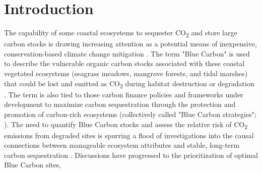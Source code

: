 \section{Introduction}

The capability of some coastal ecosystems to sequester CO\textsubscript{2} and store large carbon stocks is drawing increasing attention as a potential means of inexpensive, conservation-based climate change mitigation \citep{Hiraishi:2014uo}. The term "Blue Carbon" is used to describe the vulnerable organic carbon stocks associated with these coastal vegetated ecosystems (seagrass meadows, mangrove forests, and tidal marshes) that could be lost and emitted as CO\textsubscript{2} during habitat destruction or degradation \citep{Mcleod:2011gs}. The term is also tied to those carbon finance policies and frameworks under development to maximize carbon sequestration through the protection and promotion of carbon-rich ecosystems (collectively called "Blue Carbon strategies"; \citealt{Pendleton:2012hz}). The need to quantify Blue Carbon stocks and assess the relative risk of CO\textsubscript{2} emissions from degraded sites is spurring a flood of investigations into the causal connections between manageable ecosystem attributes and stable, long-term carbon sequestration \citep{Howard:2017jz, Macreadie:2017dt}. Discussions have progressed to the prioritization of optimal Blue Carbon sites, 

